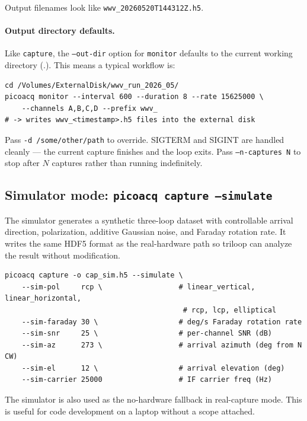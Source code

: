 \documentclass[11pt]{article}
\begin{document}
Output filenames look like
\texttt{wwv\_20260520T144312Z.h5}.

\paragraph{Output directory defaults.}  Like \texttt{capture}, the
\texttt{--out-dir} option for \texttt{monitor} defaults to the current
working directory (.).  This means a typical workflow is:

\begin{lstlisting}[style=shell]
cd /Volumes/ExternalDisk/wwv_run_2026_05/
picoacq monitor --interval 600 --duration 8 --rate 15625000 \
    --channels A,B,C,D --prefix wwv_
# -> writes wwv_<timestamp>.h5 files into the external disk
\end{lstlisting}

Pass \texttt{-d /some/other/path} to override.  SIGTERM and SIGINT are handled
cleanly --- the current capture finishes and the loop exits.  Pass
\texttt{--n-captures N} to stop after $N$ captures rather than running
indefinitely.

\subsection{Simulator mode: \texttt{picoacq capture --simulate}}
\label{sec:simulator}

The simulator generates a synthetic three-loop dataset with controllable
arrival direction, polarization, additive Gaussian noise, and Faraday
rotation rate.  It writes the same HDF5 format as the real-hardware
path so \textsf{triloop} can analyze the result without modification.

\begin{lstlisting}[style=shell]
picoacq capture -o cap_sim.h5 --simulate \
    --sim-pol     rcp \                  # linear_vertical, linear_horizontal,
                                          # rcp, lcp, elliptical
    --sim-faraday 30 \                   # deg/s Faraday rotation rate
    --sim-snr     25 \                   # per-channel SNR (dB)
    --sim-az      273 \                  # arrival azimuth (deg from N CW)
    --sim-el      12 \                   # arrival elevation (deg)
    --sim-carrier 25000                  # IF carrier freq (Hz)
\end{lstlisting}

The simulator is also used as the no-hardware fallback in real-capture
mode.  This is useful for code development on a laptop without a scope
attached.
\end{document}
